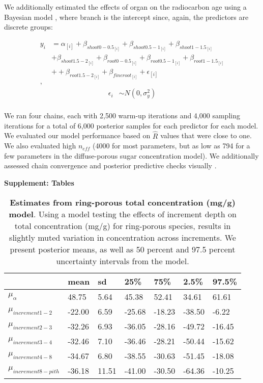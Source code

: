 \documentclass{article}\usepackage[]{graphicx}\usepackage[]{color}
\begin{document}
We additionally estimated the effects of organ on the radiocarbon age using a Bayesian model \citep{brms, R}, where branch is the intercept since, again, the predictors are discrete groups:

\begin{align*}
y_i &= \alpha_{[i]} + \beta_{shoot0-0.5_{[i]}} + \beta_{shoot0.5-1_{[i]}} + \beta_{shoot1-1.5_{[i]}}\\
&+ \beta_{shoot1.5-2_{[i]}} + \beta_{root0-0.5_{[i]}} + \beta_{root0.5-1_{[i]}} + \beta_{root1-1.5_{[i]}}\\
&+ + \beta_{root1.5-2_{[i]}} + \beta_{fineroot_{[i]}} +\epsilon_{[i]}\\,
\end{align*}
\begin{align*}
\epsilon_i & \sim N(0,\sigma^2_y) \\
\end{align*}

We ran four chains, each with 2,500 warm-up iterations and 4,000 sampling iterations for a total of 6,000 posterior samples for each predictor for each model. We evaluated our model performance based on $\hat{R}$ values that were close to one. We also evaluated high $n_{eff}$ (4000 for most parameters, but as low as 794 for a few parameters in the diffuse-porous sugar concentration model). We additionally assessed chain convergence and posterior predictive checks visually \citep{BDA}.



\textbf{\LARGE{Supplement: Tables}} 

\begin{table}[ht]
\centering
\caption{\textbf{Estimates from ring-porous total concentration (mg/g) model}. Using a model testing the effects of increment depth on total concentration (mg/g) for ring-porous species, results in slightly muted variation in concentration across increments. We present posterior means, as well as 50 percent and 97.5 percent uncertainty intervals from the model.} 
\label{tab:ringtot}
\begingroup\footnotesize
\begin{tabular}{|p{}|p{}|p{}|p{}|p{}|p{}|p{}|}
  \hline
 & mean & sd & 25\% & 75\% & 2.5\% & 97.5\% \\ 
  \hline
$\mu_{\alpha}$ & 48.75 & 5.64 & 45.38 & 52.41 & 34.61 & 61.61 \\ 
  $\mu_{increment 1-2}$ & -22.00 & 6.59 & -25.68 & -18.23 & -38.50 & -6.22 \\ 
  $\mu_{increment 2-3}$ & -32.26 & 6.93 & -36.05 & -28.16 & -49.72 & -16.45 \\ 
  $\mu_{increment 3-4}$ & -32.46 & 7.10 & -36.46 & -28.21 & -50.44 & -15.62 \\ 
  $\mu_{increment 4-8}$ & -34.67 & 6.80 & -38.55 & -30.63 & -51.45 & -18.08 \\ 
  $\mu_{increment 8-pith}$ & -36.18 & 11.51 & -41.00 & -30.50 & -64.36 & -10.25 \\ 
   \hline
\end{tabular}
\endgroup
\end{table}
\end{document}
